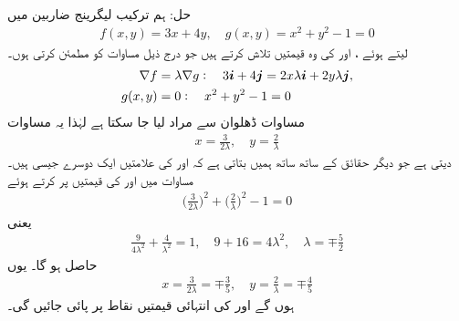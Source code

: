 حل:\quad
ہم ترکیب لیگرینج ضاربین  میں
\begin{align*}
f(x,y)=3x+4y,\quad g(x,y)=x^2+y^2-1=0
\end{align*} 
لیتے ہوئے ،  اور  کی وہ قیمتیں تلاش کرتے ہیں جو  درج ذیل  مساوات کو مطمئن کرتی ہوں۔
\begin{align*}
\nabla f&=\lambda \nabla g:\quad 3{\boldsymbol{i}}+4{\boldsymbol{j}}=2x\lambda{\boldsymbol{i}}+2y\lambda {\boldsymbol{j}},\\
g(x,y)&=0:\quad x^2+y^2-1=0
\end{align*}
مساوات ڈھلوان سے مراد  لیا جا سکتا ہے لہٰذا یہ مساوات
\begin{align*}
x=\frac{3}{2\lambda},\quad y=\frac{2}{\lambda}
\end{align*}
دیتی ہے  جو  دیگر حقائق کے ساتھ ساتھ ہمیں بتاتی ہے  کہ  اور  کی علامتیں ایک دوسرے جیسی ہیں۔مساوات  میں  اور  کی  قیمتیں پر کرتے ہوئے
\begin{align*}
\big(\frac{3}{2\lambda}\big)^2+\big(\frac{2}{\lambda}\big)^2-1=0
\end{align*}
یعنی
\begin{align*}
\frac{9}{4\lambda^2}+\frac{4}{\lambda^2}=1,\quad 9+16=4\lambda^2,\quad \lambda=\mp\frac{5}{2}
\end{align*}
حاصل ہو گا۔ یوں 
\begin{align*}
x=\frac{3}{2\lambda}=\mp\frac{3}{5},\quad y=\frac{2}{\lambda}=\mp\frac{4}{5}
\end{align*}
ہوں گے اور  کی انتہائی قیمتیں نقاط  پر پائی جائیں گی۔

